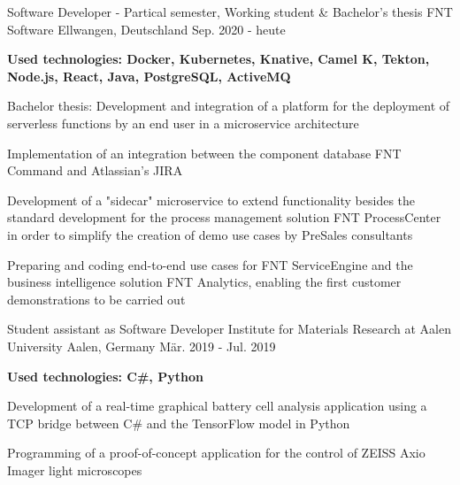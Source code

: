 

\begin{cventries}

\cventry
  {Software Developer - Partical semester, Working student \& Bachelor's thesis} %
  {\faBuilding{} FNT Software} %
  {Ellwangen, Deutschland} %
  {Sep. 2020 - heute} %
  {
    \begin{cvitems} %
      {\scriptsize\textbf{Used technologies: Docker, Kubernetes, Knative, Camel K, Tekton, Node.js, React, Java, PostgreSQL, ActiveMQ}}
      \item {}
      \item {Bachelor thesis: Development and integration of a platform for the deployment of serverless functions by an end user in a microservice architecture}
      \item {Implementation of an integration between the component database FNT Command and Atlassian's JIRA}
      \item {Development of a "sidecar" microservice to extend functionality besides the standard development for the process management solution FNT ProcessCenter in order to simplify the creation of demo use cases by PreSales consultants}
      \item {Preparing and coding end-to-end use cases for FNT ServiceEngine and the business intelligence solution FNT Analytics, enabling the first customer demonstrations to be carried out}
    \end{cvitems} 
  }

  \cventry
    {Student assistant as Software Developer} %
    {\faFlask{} Institute for Materials Research at Aalen University} %
    {Aalen, Germany} %
    {Mär. 2019 - Jul. 2019} %
    {
      \begin{cvitems} %
        {\scriptsize\textbf{Used technologies: C\#, Python}}
        \item {}
        \item {Development of a real-time graphical battery cell analysis application using a TCP bridge between C\# and the TensorFlow model in Python}
        \item {Programming of a proof-of-concept application for the control of ZEISS Axio Imager light microscopes}
      \end{cvitems}
    }


\end{cventries}

